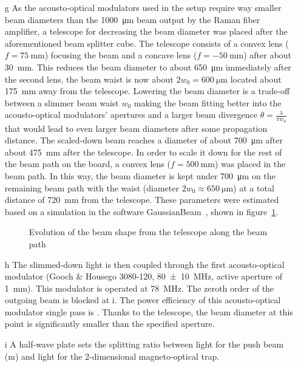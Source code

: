 \begin{itemize}
    \item[g] As the acousto-optical modulators used in the setup require way smaller beam diameters than the \SI{1000}{\micro\meter} beam output by the Raman fiber amplifier, a telescope for decreasing the beam diameter was placed after the aforementioned beam splitter cube. The telescope consists of a convex lens ($f = \SI{75}{\milli\meter}$) focusing the beam and a concave lens ($f = \SI{-50}{\milli\meter}$) after about \SI{30}{\milli\meter}. This reduces the beam diameter to about \SI{650}{\micro\meter} immediately after the second lens, the beam waist is now about $2w_0 = \SI{600}{\micro\meter}$ located about \SI{175}{\milli\meter} away from the telescope. Lowering the beam diameter is a trade-off between a slimmer beam waist $w_0$ making the beam fitting better into the acousto-optical modulators' apertures and a larger beam divergence $\theta = \frac{\lambda}{\pi w_0}$ that would lead to even larger beam diameters after some propagation distance. The scaled-down beam reaches a diameter of about \SI{700}{\micro\meter} after about \SI{475}{\milli\meter} after the telescope. In order to scale it down for the rest of the beam path on the board, a convex lens ($f = \SI{500}{\milli\meter}$) was placed in the beam path. In this way, the beam diameter is kept under \SI{700}{\micro\meter} on the remaining beam path with the waist (diameter $2w_0 \approx \SI{650}{\micro\meter}$) at a total distance of \SI{720}{\milli\meter} from the telescope.  These parameters were estimated based on a simulation in the software GaussianBeam~\cite{noauthor_gaussianbeam_nodate}, shown in figure~\ref{fig:beam_diameter_evolution}.

\begin{figure}
    \caption{Evolution of the beam shape from the telescope along the beam path}
    \label{fig:beam_diameter_evolution}
\end{figure}

    \item[h] The slimmed-down light is then coupled through the first acousto-optical modulator (Gooch \& Housego 3080-120, \SI{80(10)}{\mega\hertz}, active aperture of \SI{1}{\milli\meter}). This modulator is operated at \SI{+78}{\mega\hertz}. The zeroth order of the outgoing beam is blocked at i. The power efficiency of this acousto-optical modulator single pass is . Thanks to the telescope, the beam diameter at this point is significantly smaller than the specified aperture.
    
    \item[i] A half-wave plate sets the splitting ratio between light for the push beam (m) and light for the 2-dimensional magneto-optical trap.
    

\end{itemize}
